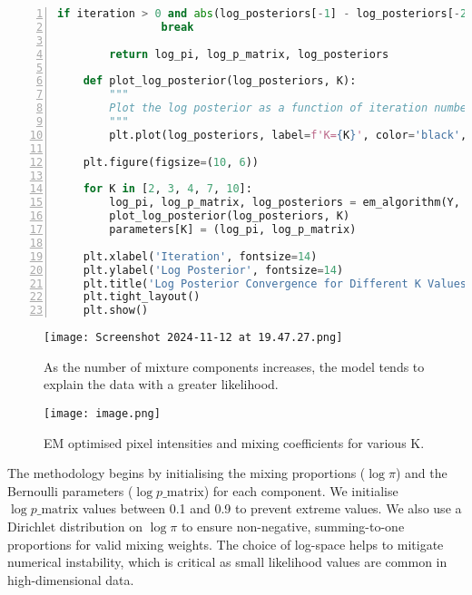 \documentclass{article}
\begin{document}
\begin{enumerate}
\begin{lstlisting}[language=Python, numbers=left, frame=single, breaklines=true, basicstyle=\small]
            if iteration > 0 and abs(log_posteriors[-1] - log_posteriors[-2]) < tol:
                break
    
        return log_pi, log_p_matrix, log_posteriors
    
    def plot_log_posterior(log_posteriors, K):
        """
        Plot the log posterior as a function of iteration number.
        """
        plt.plot(log_posteriors, label=f'K={K}', color='black', linewidth=1.5)
    
    plt.figure(figsize=(10, 6))
    
    for K in [2, 3, 4, 7, 10]:
        log_pi, log_p_matrix, log_posteriors = em_algorithm(Y, K)
        plot_log_posterior(log_posteriors, K)
        parameters[K] = (log_pi, log_p_matrix)
        
    plt.xlabel('Iteration', fontsize=14)
    plt.ylabel('Log Posterior', fontsize=14)
    plt.title('Log Posterior Convergence for Different K Values (Grayscale)', fontsize=16)
    plt.tight_layout()
    plt.show()
    \end{lstlisting}

    \begin{figure}
        \centering
        \texttt{[image: Screenshot 2024-11-12 at 19.47.27.png]}
        \caption{As the number of mixture components increases, the model tends to explain the data with a greater likelihood.}
        \label{fig:enter-label}
    \end{figure}

    \begin{figure}
        \centering
        \texttt{[image: image.png]}
        \caption{EM optimised pixel intensities and mixing coefficients for various K.}
        \label{fig:enter-label}
    \end{figure}
    
    The methodology begins by initialising the mixing proportions ($\log \pi$) and the Bernoulli parameters ($\log p\_\text{matrix}$) for each component. We initialise $\log p\_\text{matrix}$ values between 0.1 and 0.9 to prevent extreme values. We also use a Dirichlet distribution on $\log \pi$ to ensure non-negative, summing-to-one proportions for valid mixing weights. The choice of log-space helps to mitigate numerical instability, which is critical as small likelihood values are common in high-dimensional data.

    \vspace{0.8em}


\end{enumerate}
\end{document}
